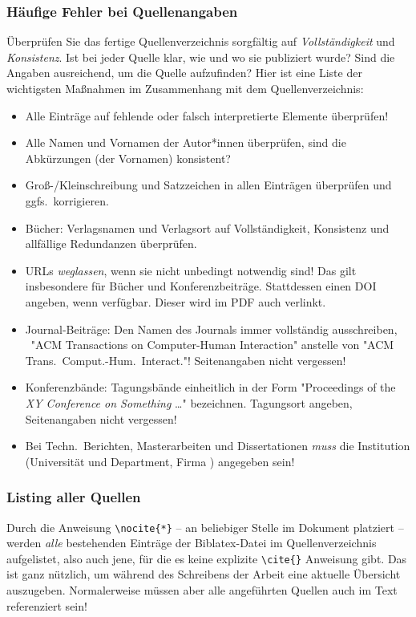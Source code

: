 \subsubsection{Häufige Fehler bei Quellenangaben}

Überprüfen Sie das fertige Quellenverzeichnis sorgfältig auf
\emph{Vollständigkeit} und \emph{Konsistenz}. Ist bei jeder Quelle klar, wie
und wo sie publiziert wurde? Sind die Angaben ausreichend, um die Quelle
aufzufinden? Hier ist eine Liste der wichtigsten Maßnahmen im Zusammenhang
mit dem Quellenverzeichnis:
%
\begin{itemize}
    \item Alle Einträge auf fehlende oder falsch interpretierte Elemente
	überprüfen!
    \item Alle Namen und Vornamen der Autor*innen überprüfen, sind die
	Abkürzungen (der Vornamen) konsistent?
    \item Groß-/Kleinschreibung und Satzzeichen in allen Einträgen überprüfen
	und ggfs.\ korrigieren.
    \item Bücher: Verlagsnamen und Verlagsort auf Vollständigkeit, Konsistenz
	und allfällige Redundanzen überprüfen.
    \item URLs \emph{weglassen}, wenn sie nicht unbedingt notwendig sind! Das
	gilt insbesondere für Bücher und Konferenzbeiträge. Stattdessen einen DOI
    angeben, wenn verfügbar. Dieser wird im PDF auch verlinkt.
    \item Journal-Beiträge: Den Namen des Journals immer vollständig
	ausschreiben, \zB\ "ACM Transactions on Computer-Human Interaction"
	anstelle von "ACM Trans.\ Comput.-Hum.\ Interact."! Seitenangaben nicht
	vergessen!
    \item Konferenzbände: Tagungsbände einheitlich in der Form "Proceedings of
	the \emph{XY Conference on Something} \ldots" bezeichnen. Tagungsort
	angeben, Seitenangaben nicht vergessen!
    \item Bei Techn.\ Berichten, Masterarbeiten und Dissertationen \emph{muss}
	die Institution (Universität und Department, Firma \etc) angegeben sein!
\end{itemize}

\subsubsection{Listing aller Quellen}

Durch die Anweisung \verb!\nocite{*}! -- an beliebiger Stelle im Dokument
platziert -- werden \emph{alle} bestehenden Einträge der Biblatex-Datei im
Quellenverzeichnis aufgelistet, also auch jene, für die es keine explizite
\verb!\cite{}! Anweisung gibt. Das ist ganz nützlich, um während des
Schreibens der Arbeit eine aktuelle Übersicht auszugeben. Normalerweise
müssen aber alle angeführten Quellen auch im Text referenziert sein!


